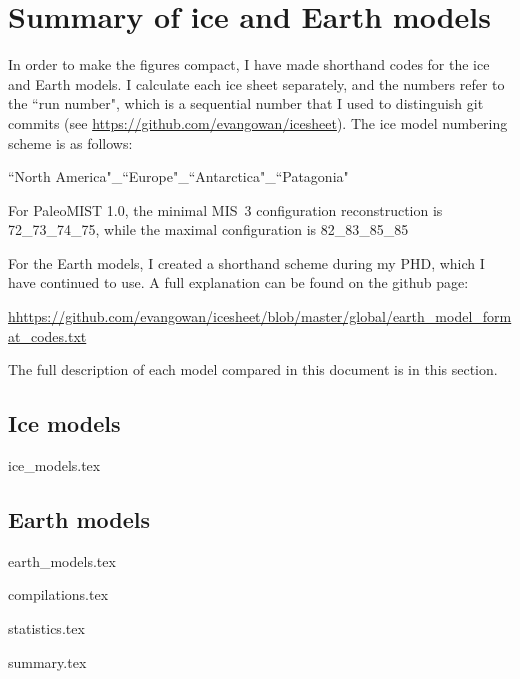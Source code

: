 \documentclass[a4paper,12pt]{article}
\begin{document}
\section{Summary of ice and Earth models}


In order to make the figures compact, I have made shorthand codes for the ice and Earth models. I calculate each ice sheet separately, and the numbers refer to the ``run number", which is a sequential number that I used to distinguish git commits (see \url{https://github.com/evangowan/icesheet}). The ice model numbering scheme is as follows:

``North America"\_``Europe"\_``Antarctica"\_``Patagonia"

For PaleoMIST 1.0, the minimal MIS~3 configuration reconstruction is 72\_73\_74\_75, while the maximal configuration is 82\_83\_85\_85

For the Earth models, I created a shorthand scheme during my PHD, which I have continued to use. A full explanation can be found on the github page:

\url{hhttps://github.com/evangowan/icesheet/blob/master/global/earth_model_format_codes.txt}

The full description of each model compared in this document is in this section.



\subsection{Ice models}

{ice_models.tex}

\subsection{Earth models}

{earth_models.tex}

\newpage


{compilations.tex}

\newpage

{statistics.tex}


\newpage

{summary.tex}

\clearpage

\newpage



\end{document}

